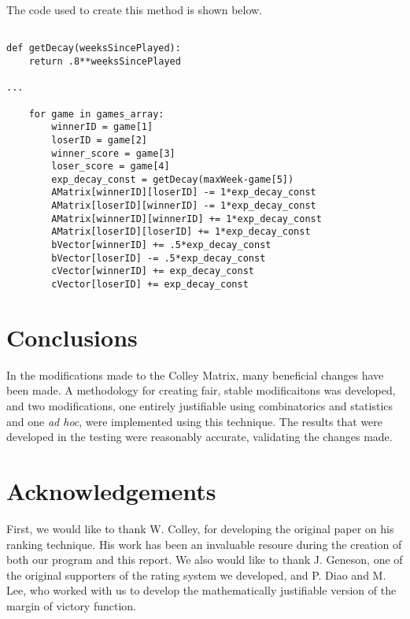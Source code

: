 \documentclass[12pt, letterpaper]{article}
\begin{document}
\par The code used to create this method is shown below.

\begin{verbatim}

def getDecay(weeksSincePlayed):
    return .8**weeksSincePlayed

...

    for game in games_array:
        winnerID = game[1]
        loserID = game[2]
        winner_score = game[3]
        loser_score = game[4]
        exp_decay_const = getDecay(maxWeek-game[5])           
        AMatrix[winnerID][loserID] -= 1*exp_decay_const
        AMatrix[loserID][winnerID] -= 1*exp_decay_const
        AMatrix[winnerID][winnerID] += 1*exp_decay_const               
        AMatrix[loserID][loserID] += 1*exp_decay_const
        bVector[winnerID] += .5*exp_decay_const
        bVector[loserID] -= .5*exp_decay_const
        cVector[winnerID] += exp_decay_const
        cVector[loserID] += exp_decay_const

\end{verbatim}

\section{Conclusions}

\par In the modifications made to the Colley Matrix, many beneficial changes have been made.  A methodology for creating fair, stable modificaitons was developed, and two modifications, one entirely justifiable using combinatorics and statistics and one \textit{ad hoc}, were implemented using this technique.  The results that were developed in the testing were reasonably accurate, validating the changes made.

\section{Acknowledgements}

\par First, we would like to thank W. Colley, for developing the original paper on his ranking technique.  His work has been an invaluable resoure during the creation of both our program and this report.  We also would like to thank J. Geneson, one of the original supporters of the rating system we developed, and P. Diao and M. Lee, who worked with us to develop the mathematically justifiable version of the margin of victory function.
\end{document}
